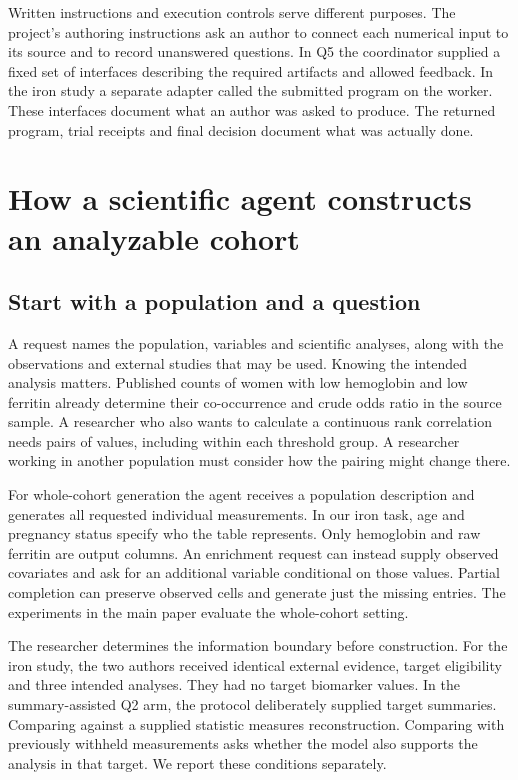 \documentclass[11pt,letterpaper]{article}
\begin{document}
Written instructions and execution controls serve different purposes. The project's authoring instructions ask an author to connect each numerical input to its source and to record unanswered questions. In Q5 the coordinator supplied a fixed set of interfaces describing the required artifacts and allowed feedback. In the iron study a separate adapter called the submitted program on the worker. These interfaces document what an author was asked to produce. The returned program, trial receipts and final decision document what was actually done.


\section{How a scientific agent constructs an analyzable cohort}

\subsection{Start with a population and a question}

A request names the population, variables and scientific analyses, along with the observations and external studies that may be used. Knowing the intended analysis matters. Published counts of women with low hemoglobin and low ferritin already determine their co-occurrence and crude odds ratio in the source sample. A researcher who also wants to calculate a continuous rank correlation needs pairs of values, including within each threshold group. A researcher working in another population must consider how the pairing might change there.


For whole-cohort generation the agent receives a population description and generates all requested individual measurements. In our iron task, age and pregnancy status specify who the table represents. Only hemoglobin and raw ferritin are output columns. An enrichment request can instead supply observed covariates and ask for an additional variable conditional on those values. Partial completion can preserve observed cells and generate just the missing entries. The experiments in the main paper evaluate the whole-cohort setting.


The researcher determines the information boundary before construction. For the iron study, the two authors received identical external evidence, target eligibility and three intended analyses. They had no target biomarker values. In the summary-assisted Q2 arm, the protocol deliberately supplied target summaries. Comparing against a supplied statistic measures reconstruction. Comparing with previously withheld measurements asks whether the model also supports the analysis in that target. We report these conditions separately.
\end{document}

